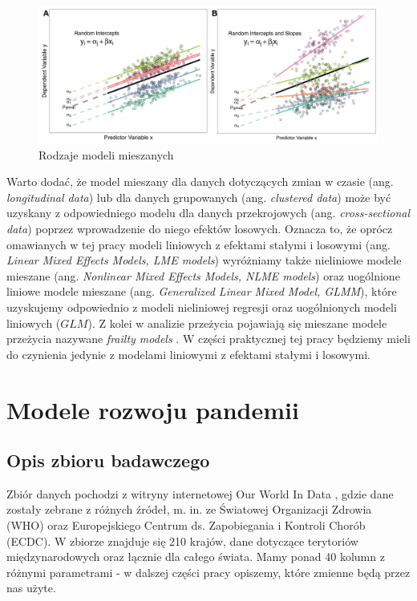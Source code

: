 \documentclass[12pt]{mwbk}
\theoremstyle{plain}
\theoremstyle{definition}
\theoremstyle{definition}
\newcommand\zrodlo[1]{\par\vspace{-3mm}{\small\textit{Źródło: }#1 }}
\begin{document}
 
 \begin{figure}[!ht]
 	\centering
 	\includegraphics[width=\linewidth]{rys/random_types.jpg}
 	\caption{Rodzaje modeli mieszanych}
 	\label{fig:random_types}
 	\zrodlo{\cite{brief}}
 \end{figure}

 Warto dodać, że model mieszany dla danych dotyczących zmian w czasie (ang. \textit{longitudinal data}) lub dla danych grupowanych (ang. \textit{clustered data}) może być uzyskany z odpowiedniego modelu dla danych przekrojowych (ang. \textit{cross-sectional data}) poprzez wprowadzenie do niego efektów losowych. Oznacza to, że oprócz omawianych w tej pracy modeli liniowych z efektami stałymi i losowymi (ang. \textit{Linear Mixed Effects Models, LME models}) wyróżniamy także nieliniowe modele mieszane (ang. \textit{Nonlinear Mixed Effects Models, NLME models}) oraz uogólnione liniowe modele mieszane (ang. \textit{Generalized Linear Mixed Model, GLMM}), które uzyskujemy odpowiednio z modeli nieliniowej regresji oraz uogólnionych modeli liniowych ($GLM$). Z kolei w analizie przeżycia pojawiają się mieszane modele przeżycia nazywane \textit{frailty models} \cite{insurance}. W części praktycznej tej pracy będziemy mieli do czynienia jedynie z modelami liniowymi z efektami stałymi i losowymi.
 
\chapter{Modele rozwoju pandemii}
\section{Opis zbioru badawczego}

Zbiór danych pochodzi z witryny internetowej Our World In Data \cite{owid}, gdzie dane zostały zebrane z różnych źródeł, m. in. ze Światowej Organizacji Zdrowia (WHO) oraz Europejskiego Centrum ds. Zapobiegania i Kontroli Chorób (ECDC). W zbiorze znajduje się 210 krajów, dane dotyczące terytoriów międzynarodowych oraz łącznie dla całego świata. Mamy ponad 40 kolumn z różnymi parametrami - w dalszej części pracy opiszemy, które zmienne będą przez nas użyte.
\end{document}
